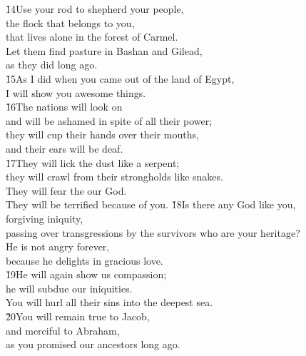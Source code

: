 \begin{poetry}
\poeml \v{14}Use your rod to shepherd your people, \\
\poemll    the flock that belongs to you, \\
\poemlll       that lives alone in the forest of Carmel. \\
\poeml Let them find pasture in Bashan and Gilead, \\
\poemll    as they did long ago. \\
\poeml \v{15}As I did when you came out of the land of Egypt, \\
\poemll    I will show you awesome things. \\
\poeml \v{16}The nations will look on \\
\poemll    and will be ashamed in spite of all their power; \\
\poeml they will cup their hands over their mouths, \\
\poemll    and their ears will be deaf. \\
\poeml \v{17}They will lick the dust like a serpent; \\
\poemll    they will crawl from their strongholds like snakes. \\
\poeml They will fear the  our God. \\
\poemll    They will be terrified because of you.
\poeml \v{18}Is there any God like you, \\
\poemll    forgiving iniquity, \\
\poemlll       passing over transgressions by the survivors who are your heritage? \\
\poeml He is not angry forever, \\
\poemll    because he delights in gracious love. \\
\poeml \v{19}He will again show us compassion; \\
\poemll    he will subdue our iniquities. \\
\poeml You will hurl all their sins into the deepest sea. \\
\poeml \v{20}You will remain true to Jacob, \\
\poemll    and merciful to Abraham, \\
\poeml as you promised our ancestors long ago.\end{poetry}
